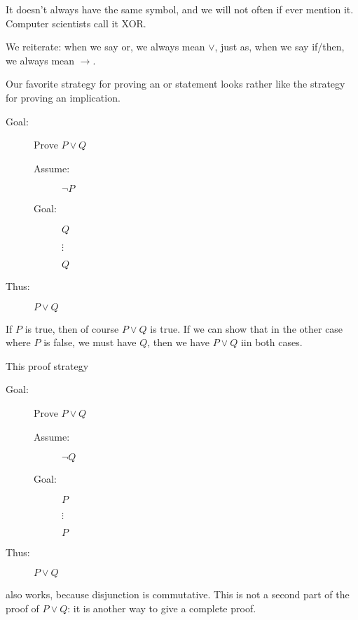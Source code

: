 \documentclass[12pt]{article}
\begin{document}
It doesn't always have the same symbol, and we will not often if ever mention it.  Computer scientists call it XOR.

We reiterate:  when we say or, we always mean $\vee$, just as, when we say if/then, we always mean $\rightarrow$.

Our favorite strategy for proving an or statement looks rather like the strategy for proving an implication.

\begin{description}

\item[Goal:]  Prove $P \vee Q$

\begin{description}
\item[Assume:] $\neg P$

\item[Goal:] $Q$

$\vdots$

$Q$


\end{description}

\item[Thus:]  $P \vee Q$

\end{description}

If $P$ is true, then of course $P \vee Q$ is true.  If we can show that in the other case where $P$ is false, we must have $Q$, then we have $P \vee Q$ iin both cases.

\newpage

This proof strategy

\begin{description}

\item[Goal:]  Prove $P \vee Q$

\begin{description}
\item[Assume:] $\neg Q$

\item[Goal:] $P$

$\vdots$

$P$


\end{description}

\item[Thus:]  $P \vee Q$

\end{description}

also works, because disjunction is commutative.  This is not a second part of the proof of $P \vee Q$:  it is another way to give a complete proof.
\end{document}
